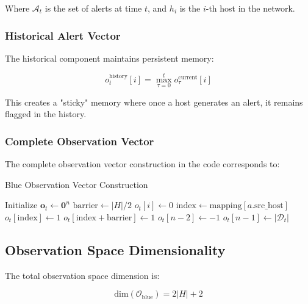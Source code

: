 \documentclass[12pt,a4paper]{article}
\begin{document}
Where $\mathcal{A}_t$ is the set of alerts at time $t$, and $h_i$ is the $i$-th host in the network.

\subsubsection{Historical Alert Vector}
The historical component maintains persistent memory:

\begin{equation}
o_t^{\text{history}}[i] = \max_{\tau=0}^{t} o_\tau^{\text{current}}[i]
\end{equation}

This creates a "sticky" memory where once a host generates an alert, it remains flagged in the history.

\subsubsection{Complete Observation Vector}
The complete observation vector construction in the code corresponds to:

\begin{algorithm}
\caption{Blue Observation Vector Construction}
\begin{algorithmic}[1]
\STATE Initialize $\mathbf{o}_t \leftarrow \mathbf{0}^{n}$
\STATE $\text{barrier} \leftarrow |H|/2$
    \STATE $o_t[i] \leftarrow 0$ 
\ENDFOR
{}
        \STATE $\text{index} \leftarrow \text{mapping}[a.\text{src\_host}]$
        \STATE $o_t[\text{index}] \leftarrow 1$ 
        \STATE $o_t[\text{index} + \text{barrier}] \leftarrow 1$ 
    \ENDIF
\ENDFOR
\STATE $o_t[n-2] \leftarrow -1$ 
\STATE $o_t[n-1] \leftarrow |\mathcal{D}_t|$ 
\end{algorithmic}
\end{algorithm}

\subsection{Observation Space Dimensionality}
The total observation space dimension is:

\begin{equation}
\text{dim}(\mathcal{O}_{\text{blue}}) = 2|H| + 2
\end{equation}
\end{document}
